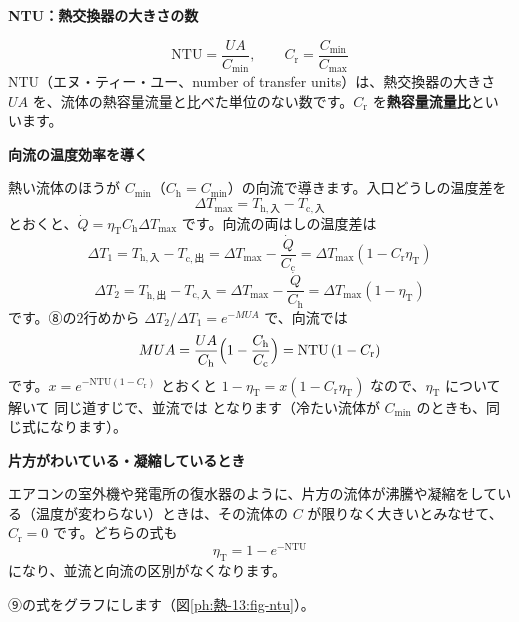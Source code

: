 \noindent\textbf{NTU：熱交換器の大きさの数}\par\nobreak
\[ \mathrm{NTU}=\frac{UA}{C_{\min}},\qquad C_{\mathrm r}=\frac{C_{\min}}{C_{\max}} \]
NTU（エヌ・ティー・ユー、number of transfer units）は、熱交換器の大きさ $UA$ を、流体の熱容量流量と比べた単位のない数です。$C_{\mathrm r}$ を\textbf{熱容量流量比}といいます。

\noindent\textbf{向流の温度効率を導く}\par\nobreak
熱い流体のほうが $C_{\min}$（$C_{\mathrm h}=C_{\min}$）の向流で導きます。入口どうしの温度差を
\[ \Delta T_{\max}=T_{\mathrm h,\text{入}}-T_{\mathrm c,\text{入}} \]
とおくと、$\dot Q=\eta_{\mathrm T}C_{\mathrm h}\Delta T_{\max}$ です。向流の両はしの温度差は
\[ \Delta T_1=T_{\mathrm h,\text{入}}-T_{\mathrm c,\text{出}}=\Delta T_{\max}-\frac{\dot Q}{C_{\mathrm c}}=\Delta T_{\max}(1-C_{\mathrm r}\eta_{\mathrm T}) \]
\[ \Delta T_2=T_{\mathrm h,\text{出}}-T_{\mathrm c,\text{入}}=\Delta T_{\max}-\frac{\dot Q}{C_{\mathrm h}}=\Delta T_{\max}(1-\eta_{\mathrm T}) \]
です。⑧の2行めから $\Delta T_2/\Delta T_1=e^{-MUA}$ で、向流では
\[ MUA=\frac{UA}{C_{\mathrm h}}\Bigl(1-\frac{C_{\mathrm h}}{C_{\mathrm c}}\Bigr)=\mathrm{NTU}\,(1-C_{\mathrm r}) \]
です。$x=e^{-\mathrm{NTU}(1-C_{\mathrm r})}$ とおくと $1-\eta_{\mathrm T}=x(1-C_{\mathrm r}\eta_{\mathrm T})$ なので、$\eta_{\mathrm T}$ について解いて
同じ道すじで、並流では
\label{ph:熱-13:ntu}となります（冷たい流体が $C_{\min}$ のときも、同じ式になります）。

\noindent\textbf{片方がわいている・凝縮しているとき}\par\nobreak
エアコンの室外機や発電所の復水器のように、片方の流体が沸騰や凝縮をしている（温度が変わらない）ときは、その流体の $C$ が限りなく大きいとみなせて、$C_{\mathrm r}=0$ です。どちらの式も
\[ \eta_{\mathrm T}=1-e^{-\mathrm{NTU}} \]
になり、並流と向流の区別がなくなります。


\leavevmode\label{ph:熱-13:sec10}⑨の式をグラフにします（図\ref{ph:熱-13:fig-ntu}）。

